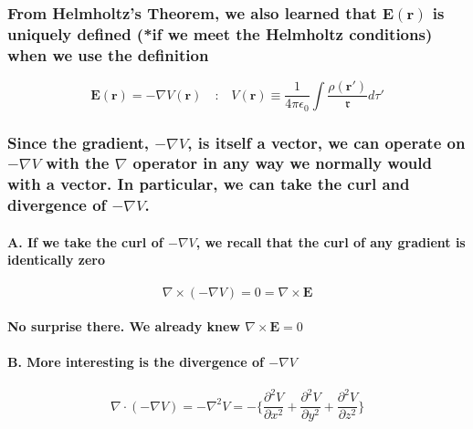 \documentclass{article}
\begin{document}
\subsubsection{From Helmholtz's Theorem, we also learned that $\boldsymbol{E(r)}$ is uniquely defined (*if we meet the Helmholtz conditions) when we use the definition}
\begin{equation*}
    \boldsymbol{E(r)}=-\nabla V(\boldsymbol{r})\quad \text{:}\quad V(\boldsymbol{r})\equiv \frac{1}{4\pi\epsilon_0}\int\frac{\rho(\boldsymbol{r'})}{\mathfrak{r}}d\tau'
\end{equation*}
\subsubsection{Since the gradient, $-\nabla V$, is itself a vector, we can operate on $-\nabla V$ with the $\nabla $ operator in any way we normally would with a vector. In particular, we can take the curl and divergence of $-\nabla V$.}
\indent \paragraph{A. If we take the curl of $-\nabla V$, we recall that the curl of any gradient is identically zero}
\begin{equation*}
    \nabla \times (-\nabla V)=0=\nabla \times \boldsymbol{E}
\end{equation*}
\indent \paragraph{No surprise there. We already knew $\nabla \times \boldsymbol{E}=0$}
\paragraph{B. More interesting is the divergence of $-\nabla V$}
\begin{equation*}
    \nabla \cdot (-\nabla V)=-\nabla^2V=-\bigg\{ \frac{\partial^2V}{\partial x^2}+\frac{\partial^2 V}{\partial y^2}+\frac{\partial^2V}{\partial z^2}\bigg\}
\end{equation*}
\end{document}
